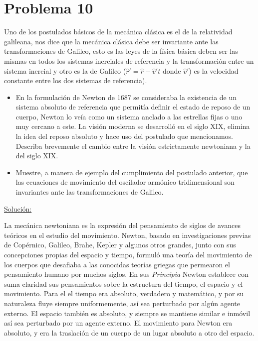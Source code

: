\documentclass[a4paper,10pt]{article}
\numberwithin{equation}{section}
\begin{document}
\vspace{.3cm}

\section{Problema 10}

Uno de los postulados básicos de la mecánica clásica es el de la relatividad galileana,
nos dice que la mecánica clásica debe ser invariante ante las transformaciones de Galileo, 
esto es las leyes de la física básica deben ser las mismas en todos los sistemas inerciales
de referencia y la transformación entre un sistema inercial y otro es la de Galileo 
($\hat{r}' = \hat{r} - \hat{v}'t$ donde $\hat{v}'$) es la velocidad constante entre los dos 
sistemas de referencia).

\begin{itemize}
 \item En la formulación de Newton de 1687 se consideraba la existencia de un sistema 
 absoluto de referencia que permitía definir el estado de reposo de un cuerpo, Newton lo
 veía como un sistema anclado a las estrellas fijas o uno muy cercano a este. La visión 
 moderna se desarrolló en el siglo XIX, elimina la idea del reposo absoluto y hace 
 uso del postulado que mencionamos. Describa brevemente el cambio entre la visión 
 estrictamente newtoniana y la del siglo XIX.
 \item Muestre, a manera de ejemplo del cumplimiento del postulado anterior, que las 
 ecuaciones de movimiento del oscilador armónico tridimensional son invariantes ante
 las transformaciones de Galileo.
\end{itemize}

\vspace{.3cm}

\underline{Solución:}\vspace{.3cm}

La mecánica newtoniana es la expresión del pensamiento de siglos de avances teóricos
en el estudio del movimiento. Newton, basado en investigaciones previas de Copérnico,
Galileo, Brahe, Kepler y algunos otros grandes, junto con sus concepciones propias
del espacio y tiempo, formuló una teoría del movimiento de los cuerpos que desafiaba
a las conocidas teorías griegas que permearon el pensamiento humano por muchos siglos.
En sus \emph{Principia} Newton establece con suma claridad sus pensamientos sobre la 
estructura del tiempo, el espacio y el movimiento. Para el el tiempo era absoluto, verdadero
y matemático, y por su naturaleza fluye siempre uniformemente, así sea perturbado
por algún agente externo. El espacio también es absoluto, y siempre se mantiene
similar e inmóvil así sea perturbado por un agente externo. El movimiento para Newton era 
absoluto, y era la traslación de un cuerpo de un lugar absoluto a otro del espacio. 
\end{document}
